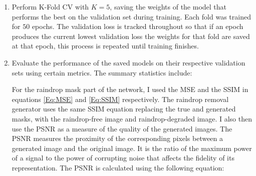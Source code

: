 \documentclass[11pt]{ociamthesis}  %
\begin{document}
\begin{enumerate}
    \item Perform K-Fold CV with $K=5$, saving the weights of the model that performs the best on the validation set during training. Each fold was trained for $50$ epochs. The validation loss is tracked throughout so that if an epoch produces the current lowest validation loss the weights for that fold are saved at that epoch, this process is repeated until training finishes. 
    \item Evaluate the performance of the saved models on their respective validation sets using certain metrics. The summary statistics include:

    For the raindrop mask part of the network, I used the MSE and the SSIM in equations \ref{Eq:MSE} and \ref{Eq:SSIM} respectively. 
    The raindrop removal generator uses the same SSIM equation replacing the true and generated masks, with the raindrop-free image and raindrop-degraded image. I also then use the PSNR\cite{TANCHENKO2014874} as a measure of the quality of the generated images. The PSNR measures the proximity of the corresponding pixels between a generated image and the original image. It is the ratio of the maximum power of a signal to the power of corrupting noise that affects the fidelity of its representation. The PSNR is calculated using the following equation:


\end{enumerate}
\end{document}
